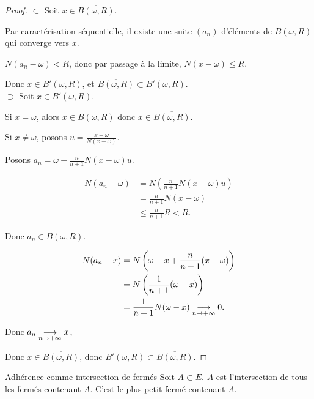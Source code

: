 \begin{proof}
    $\subset$ Soit $x \in \overline{B(\omega, R)}$.

    Par caractérisation séquentielle, il existe une suite $(a_n)$ d'éléments de
    $B(\omega, R)$ qui converge vers $x$.

    $N(a_n - \omega) < R$, donc par passage à la limite, $N(x - \omega) \leqslant R$. 

    Donc $x \in B'(\omega, R)$, et $\overline{B(\omega, R)} \subset B'(\omega, R)$. \\

    $\supset$ Soit $x \in B'(\omega, R)$.

    Si $x = \omega$, alors $x \in B(\omega, R)$ donc $x \in \overline{B(\omega, R)}$.

    Si $x \neq \omega$, posons $u = \frac{x - \omega }{N(x - \omega)}$.

    Posons $a_n = \omega + \frac n {n + 1} N(x - \omega)u$. 

    \begin{align*}
        N(a_n - \omega) & = N\left( \frac n {n + 1} N(x - \omega) u \right) \\
        & = \frac n {n + 1} N(x - \omega) \\
        & \leqslant \frac n {n + 1} R < R.  
    \end{align*}

    Donc $a_n \in B(\omega, R)$.

    \begin{align*}
        N(a_n - x) & = N\left( \omega - x + \frac n {n + 1} (x - \omega) \right) \\
        & = N\left( \frac 1 {n + 1}(\omega - x) \right) \\
        & = \frac 1 {n + 1} N(\omega - x) \underset{n \to + \infty}{\longrightarrow} 0.
    \end{align*}

    Donc $a_n \underset{n \to + \infty}{\longrightarrow} x$, 

    Donc $x \in \overline{B(\omega, R)}$, donc $B'(\omega, R) \subset \overline{B(\omega, R)}$.
\end{proof}

\begin{theoreme}{Adhérence comme intersection de fermés}{}
    Soit $A \subset E$.
    $\overline A$ est l'intersection de tous les fermés contenant $A$.
    C'est le plus petit fermé contenant $A$.
\end{theoreme}

